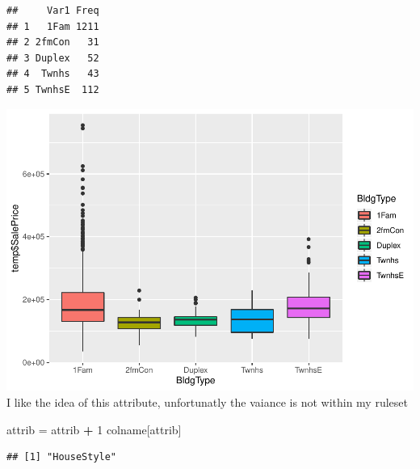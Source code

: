 \documentclass[]{article}
\newenvironment{Shaded}{\begin{snugshade}}{\end{snugshade}}
\newcommand{\DecValTok}[1]{\textcolor[rgb]{0.00,0.00,0.81}{#1}}
\newcommand{\StringTok}[1]{\textcolor[rgb]{0.31,0.60,0.02}{#1}}
\newcommand{\OperatorTok}[1]{\textcolor[rgb]{0.81,0.36,0.00}{\textbf{#1}}}
\newcommand{\NormalTok}[1]{#1}
\begin{document}
\begin{verbatim}
##     Var1 Freq
## 1   1Fam 1211
## 2 2fmCon   31
## 3 Duplex   52
## 4  Twnhs   43
## 5 TwnhsE  112
\end{verbatim}

\includegraphics{EDA_files/figure-latex/unnamed-chunk-38-1.pdf} I like
the idea of this attribute, unfortunatly the vaiance is not within my
ruleset

\begin{Shaded}
\begin{Highlighting}[]
\NormalTok{attrib =}\StringTok{ }\NormalTok{attrib }\OperatorTok{+}\StringTok{ }\DecValTok{1}
\NormalTok{colname[attrib]}
\end{Highlighting}
\end{Shaded}

\begin{verbatim}
## [1] "HouseStyle"
\end{verbatim}
\end{document}
